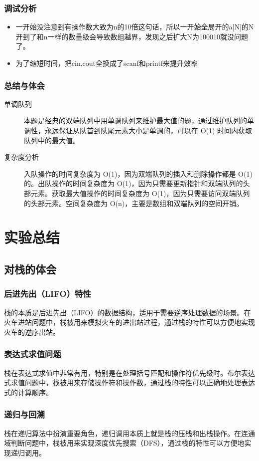 \documentclass[12pt]{article}
\begin{document}
\subsubsection{调试分析}
\begin{itemize}
    \item 一开始没注意到有操作数大致为n的10倍这句话，所以一开始全局开的a[N]的N开到了和n一样的数量级会导致数组越界，发现之后扩大N为100010就没问题了。
    \item 为了缩短时间，把cin,cout全换成了scanf和printf来提升效率
\end{itemize}
\subsubsection{总结与体会}
\begin{description}
    \item[单调队列] 本题是经典的双端队列中用单调队列来维护最大值的题，通过维护队列的单调性，永远保证从队首到队尾元素大小是单调的，可以在 O(1) 时间内获取队列中的最大值。
    \item[复杂度分析] 入队操作的时间复杂度为 O(1)，因为双端队列的插入和删除操作都是 O(1) 的。出队操作的时间复杂度为 O(1)，因为只需要更新指针和双端队列的头部元素。获取最大值操作的时间复杂度为 O(1)，因为只需要访问双端队列的头部元素。空间复杂度为 O(n)，主要是数组和双端队列的空间开销。
\end{description}

\section{实验总结}
\subsection{对栈的体会}
\subsubsection{后进先出（LIFO）特性}
{\songti 栈的本质是后进先出（LIFO）的数据结构，适用于需要逆序处理数据的场景。在火车进站问题中，栈被用来模拟火车的进出站过程，通过栈的特性可以方便地实现火车的逆序出站。}
\subsubsection{表达式求值问题}
{\songti 栈在表达式求值中非常有用，特别是在处理括号匹配和操作符优先级时。布尔表达式求值问题中，栈被用来存储操作符和操作数，通过栈的特性可以正确地处理表达式的计算顺序。}
\subsubsection{递归与回溯}
{\songti 栈在递归算法中扮演重要角色，递归调用本质上就是栈的压栈和出栈操作。在连通域判断问题中，栈被用来实现深度优先搜索（DFS），通过栈的特性可以方便地实现递归调用。}
\end{document}

